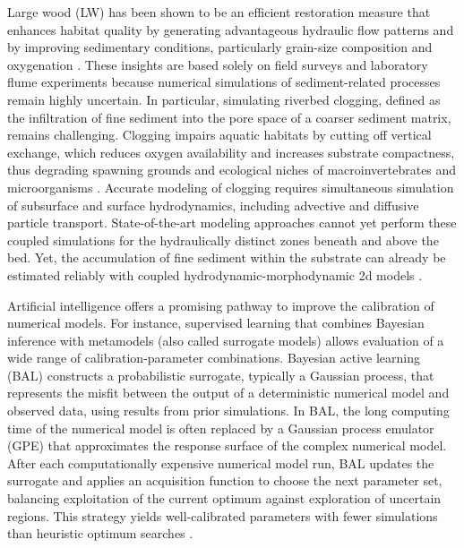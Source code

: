 \documentclass[draft,linenumbers,onecolumn]{agujournal2019} %
\begin{document}
Large wood (LW) has been shown to be an efficient restoration measure that enhances habitat quality by generating advantageous hydraulic flow patterns \cite{follett2020momentum, schalko2024enhanced} and by improving sedimentary conditions, particularly grain-size composition and oxygenation \cite{schwindt2023fuzzylogic, schalko2024flow}. These insights are based solely on field surveys and laboratory flume experiments because numerical simulations of sediment-related processes remain highly uncertain. In particular, simulating riverbed clogging, defined as the infiltration of fine sediment into the pore space of a coarser sediment matrix, remains challenging. Clogging impairs aquatic habitats by cutting off vertical exchange, which reduces oxygen availability and increases substrate compactness, thus degrading spawning grounds and ecological niches of macroinvertebrates and microorganisms \cite{banscher1976gesetzmassigkeiten, brunke1997ecological, blaschke2003clogging}. Accurate modeling of clogging requires simultaneous simulation of subsurface and surface hydrodynamics, including advective and diffusive particle transport. State-of-the-art modeling approaches cannot yet perform these coupled simulations for the hydraulically distinct zones beneath and above the bed. Yet, the accumulation of fine sediment within the substrate can already be estimated reliably with coupled hydrodynamic-morphodynamic 2d models \cite{scolari2025hydromorphodynamic}.

Artificial intelligence offers a promising pathway to improve the calibration of numerical models. For instance, supervised learning that combines Bayesian inference with metamodels (also called surrogate models) allows evaluation of a wide range of calibration-parameter combinations. Bayesian active learning (BAL) constructs a probabilistic surrogate, typically a Gaussian process, that represents the misfit between the output of a deterministic numerical model and observed data, using results from prior simulations. In BAL, the long computing time of the numerical model is often replaced by a Gaussian process emulator (GPE) that approximates the response surface of the complex numerical model. After each computationally expensive numerical model run, BAL updates the surrogate and applies an acquisition function to choose the next parameter set, balancing exploitation of the current optimum against exploration of uncertain regions. This strategy yields well-calibrated parameters with fewer simulations than heuristic optimum searches \cite{oladyshkin2020bayesian3,rasmussen2006gaussian}. 
\end{document}
